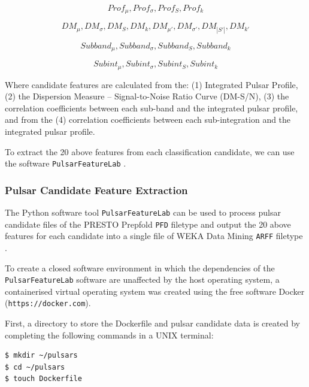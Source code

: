 \documentclass{article}
\begin{document}
\begin{equation}
    Prof_{\mu}, Prof_{\sigma}, Prof_{S}, Prof_{k}
\end{equation}

\begin{equation}
    DM_{\mu}, DM_{\sigma}, DM_{S},DM_{k},
    DM_{\mu'}, DM_{\sigma'}, DM_{|S'|},DM_{k'}
\end{equation}

\begin{equation}
    Subband_{\mu}, Subband_{\sigma}, Subband_{S}, Subband_{k}
\end{equation}

\begin{equation}
    Subint_{\mu}, Subint_{\sigma}, Subint_{S}, Subint_{k}
\end{equation}

Where candidate features are calculated from the: (1) Integrated Pulsar Profile, (2) the Dispersion Measure -- Signal-to-Noise Ratio Curve (DM-S/N), (3) the correlation coefficients between each sub-band and the integrated pulsar profile, and from the (4) correlation coefficients between each sub-integration and the integrated pulsar profile. 

To extract the 20 above features from each classification candidate, we can use the software 
\verb|PulsarFeatureLab| \autocite{lyon}.

\subsubsection{Pulsar Candidate Feature Extraction}

The Python software tool \verb|PulsarFeatureLab| can be used to process pulsar candidate files of the PRESTO Prepfold \verb|PFD| filetype and output the 20 above features for each candidate into a single file of WEKA Data Mining \verb|ARFF| filetype \autocite{lyon}.

To create a closed software environment in which the dependencies of the \verb|PulsarFeatureLab| software are unaffected by the host operating system, a containerised virtual operating system was created using the free software Docker (\verb|https://docker.com|).

First, a directory to store the Dockerfile and pulsar candidate data is created by completing the following commands in a UNIX terminal:

\begin{lstlisting}[numbers=none]
$ mkdir ~/pulsars
$ cd ~/pulsars
$ touch Dockerfile
\end{lstlisting}
\end{document}
